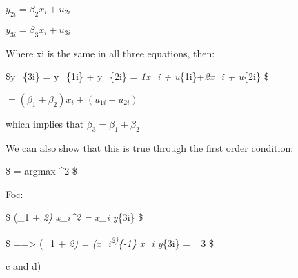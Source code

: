 \documentclass[11pt]{article}
\begin{document}
\(y_{2i} = \beta_2x_i + u_{2i}\)

\(y_{3i} = \beta_3x_i + u_{3i}\)

Where xi is the same in all three equations, then:

\$y\_\{3i\} = y\_\{1i\} + y\_\{2i\} = \beta\emph{1x\_i +
u}\{1i\}+\beta\emph{2x\_i + u}\{2i\} \$

\(=(\beta_1 + \beta_2)x_i + (u_{1i} + u_{2i})\)

which implies that \(\beta_3 = \beta_1 + \beta_2\)

We can also show that this is true through the first order condition:

\$  = argmax 
\^{}2 \$

Foc:

\$ (\beta\_1 + \beta\emph{2) \sum x\_i\^{}2 = \sum x\_i y}\{3i\} \$

\$ ==\textgreater{} (\beta\_1 + \beta\emph{2) =
(\sum x\_i\textsuperscript{2)}\{-1\} \sum x\_i y}\{3i\} = \beta\_3 \$

c and d)
\end{document}
